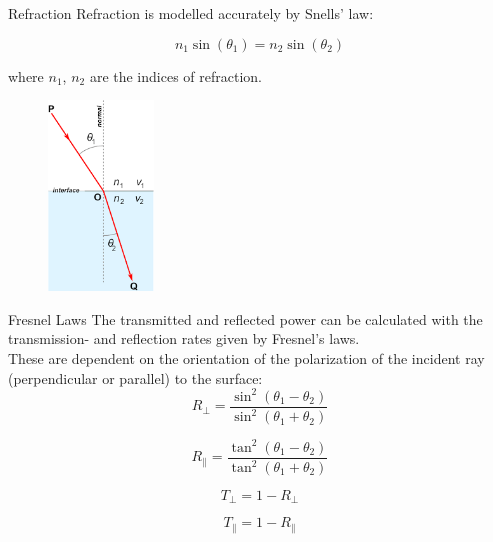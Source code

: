 \documentclass[aspectratio=43,t]{beamer}
\begin{document}
		\begin{frame}[fragile]{Refraction}
		Refraction is modelled accurately by Snells' law:

		\begin{equation*}
			n_1 \sin (\theta_1) = n_2 \sin (\theta_2)
		\end{equation*}

		where $n_1$, $n_2$ are the indices of refraction.

		\begin{figure}
		\centering
		\includegraphics[width=0.25\textwidth]{images/snell.png}
		\end{figure}

    \end{frame}

		\begin{frame}[fragile]{Fresnel Laws}
		The transmitted and reflected power can be calculated with the transmission- and 
			reflection rates given by Fresnel's laws.\\
			These are dependent on the orientation of the polarization of the incident
			ray (perpendicular or parallel) to the surface:\\

		\begin{equation*}
			R_{\perp} = \frac{\sin^2(\theta_1 - \theta_2)}{\sin^2(\theta_1 + \theta_2)}
		\end{equation*}

		\begin{equation*}
			R_{\parallel} = \frac{\tan^2(\theta_1 - \theta_2)}{\tan^2(\theta_1 + \theta_2)}
		\end{equation*}

		\begin{equation*}
			T_{\perp} = 1 - R_{\perp}
		\end{equation*}

		\begin{equation*}
			T_{\parallel} = 1 - R_{\parallel}
		\end{equation*}
    \end{frame}
\end{document}
